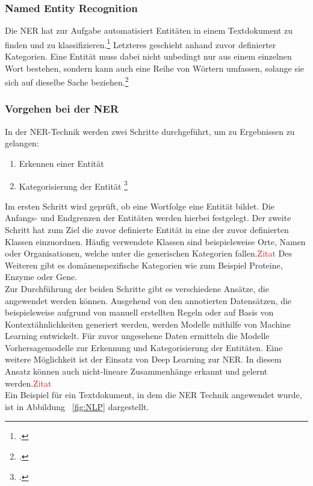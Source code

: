 \subsubsection{Named Entity Recognition}
Die \acl{NER} hat zur Aufgabe automatisiert Entitäten in einem Textdokument zu finden und zu klassifizieren.\footcite[\vglf][]{kulkrni2022} Letzteres geschieht anhand zuvor definierter Kategorien.
Eine Entität muss dabei nicht unbedingt nur aus einem einzelnen Wort bestehen, sondern kann auch eine Reihe von Wörtern umfassen, solange sie sich auf dieselbe Sache beziehen.\footcite[\vglf][]{strobl2022}

\subsubsection{Vorgehen bei der NER}
In der \ac{NER}-Technik werden zwei Schritte durchgeführt, um zu Ergebnissen zu gelangen:

\begin{enumerate}
    \item Erkennen einer Entität
    \item Kategorisierung der Entität \footcite[\vglf][ & 230]{zong2021}
\end{enumerate}


Im ersten Schritt wird geprüft, ob eine Wortfolge eine Entität bildet. Die Anfangs- und Endgrenzen der Entitäten werden hierbei festgelegt. Der zweite Schritt hat zum Ziel die zuvor definierte Entität in eine der zuvor definierten Klassen einzuordnen.
Häufig verwendete Klassen sind beispielsweise Orte, Namen oder Organisationen, welche unter die generischen Kategorien fallen.\textcolor{red}{Zitat} Des Weiteren gibt es domänenspezifische Kategorien wie zum Beispiel Proteine, Enzyme oder Gene.
\\
Zur Durchführung der beiden Schritte gibt es verschiedene Ansätze, die angewendet werden können. Ausgehend von den annotierten Datensätzen, die beispielsweise aufgrund von manuell erstellten Regeln oder auf Basis von Kontextähnlichkeiten generiert werden, werden Modelle mithilfe von Machine Learning entwickelt.
Für zuvor ungesehene Daten ermitteln die Modelle Vorhersagemodelle zur Erkennung und Kategorisierung der Entitäten. Eine weitere Möglichkeit ist der Einsatz von Deep Learning zur \ac{NER}. In diesem Ansatz können auch nicht-lineare Zusammenhänge erkannt und gelernt werden.\textcolor{red}{Zitat}
\\
Ein Beispiel für ein Textdokument, in dem die \ac{NER} Technik angewendet wurde, ist in Abbildung ~\ref{fig:NLP} dargestellt.\\



